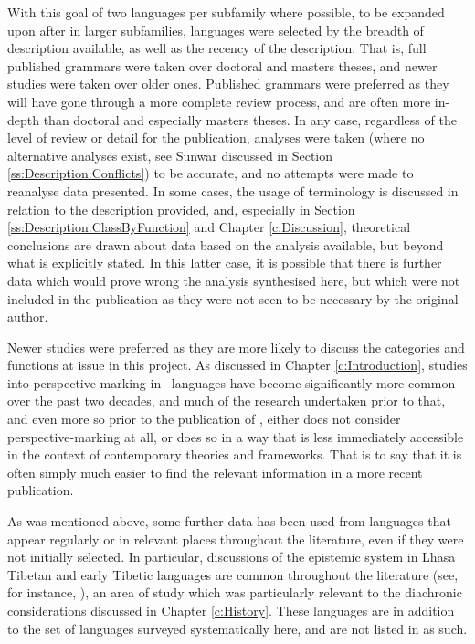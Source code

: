 With this goal of two languages per subfamily where possible, to be expanded upon after in larger subfamilies, languages were selected by the breadth of description available, as well as the recency of the description. That is, full published grammars were taken over doctoral and masters theses, and newer studies were taken over older ones. Published grammars were preferred as they will have gone through a more complete review process, and are often more in-depth than doctoral and especially masters theses. In any case, regardless of the level of review or detail for the publication, analyses were taken (where no alternative analyses exist, see Sunwar discussed in Section \ref{ss:Description:Conflicts}) to be accurate, and no attempts were made to reanalyse data presented. In some cases, the usage of terminology is discussed in relation to the description provided, and, especially in Section \ref{ss:Description:ClassByFunction} and Chapter \ref{c:Discussion}, theoretical conclusions are drawn about data based on the analysis available, but beyond what is explicitly stated. In this latter case, it is possible that there is further data which would prove wrong the analysis synthesised here, but which were not included in the publication as they were not seen to be necessary by the original author.

Newer studies were preferred as they are more likely to discuss the categories and functions at issue in this project. As discussed in Chapter \ref{c:Introduction}, studies into perspective-marking in \lfam\ languages have become significantly more common over the past two decades, and much of the research undertaken prior to that, and even more so prior to the publication of , either does not consider perspective-marking at all, or does so in a way that is less immediately accessible in the context of contemporary theories and frameworks. That is to say that it is often simply much easier to find the relevant information in a more recent publication.

As was mentioned above, some further data has been used from languages that appear regularly or in relevant places throughout the literature, even if they were not initially selected. In particular, discussions of the epistemic system in Lhasa Tibetan and early Tibetic languages are common throughout the literature (see, for instance, ), an area of study which was particularly relevant to the diachronic considerations discussed in Chapter \ref{c:History}. These languages are in addition to the set of languages surveyed systematically here, and are not listed in  as such.

